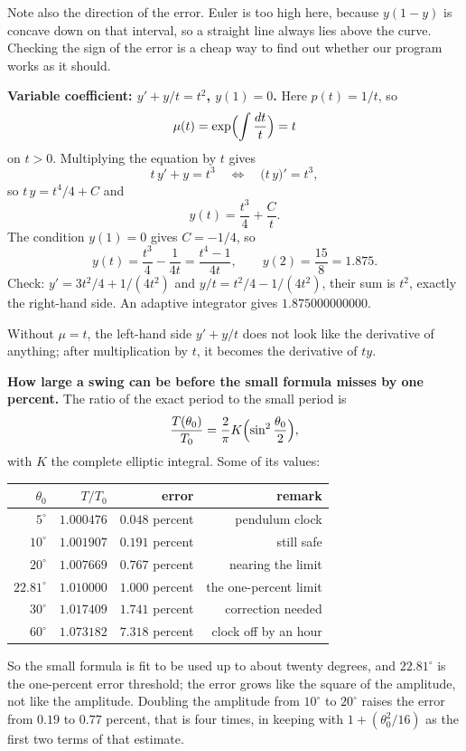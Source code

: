 Note also the direction of the error. Euler is too high here, because
$y(1-y)$ is concave down on that interval, so a straight line always lies above the curve.
Checking the sign of the error is a cheap way to find out whether our program
works as it should.

\textbf{Variable coefficient: $y'+y/t=t^{2}$, $y(1)=0$.}
Here $p(t)=1/t$, so
\[
\mu(t)=\exp\Bigl(\int\frac{dt}{t}\Bigr)=t
\]
on $t>0$. Multiplying the equation by $t$ gives
\[
t\,y'+y=t^{3}
\quad\Longleftrightarrow\quad
\bigl(t\,y\bigr)'=t^{3},
\]
so $t\,y=t^{4}/4+C$ and
\[
y(t)=\frac{t^{3}}{4}+\frac{C}{t}.
\]
The condition $y(1)=0$ gives $C=-1/4$, so
\[
y(t)=\frac{t^{3}}{4}-\frac{1}{4t}=\frac{t^{4}-1}{4t},
\qquad y(2)=\frac{15}{8}=1.875 .
\]
Check: $y'=3t^{2}/4+1/(4t^{2})$ and $y/t=t^{2}/4-1/(4t^{2})$, their sum is
$t^{2}$, exactly the right-hand side. An adaptive integrator gives $1.875000000000$.

Without $\mu=t$, the left-hand side $y'+y/t$ does not look like the derivative of anything;
after multiplication by $t$, it becomes the derivative of $ty$.

\textbf{How large a swing can be before the small formula misses by one percent.}
The ratio of the exact period to the small period is
\[
\frac{T(\theta_{0})}{T_{0}}
=\frac{2}{\pi}K\Bigl(\sin^{2}\frac{\theta_{0}}{2}\Bigr),
\]
with $K$ the complete elliptic integral. Some of its values:

\begin{center}
{\small
\begin{tabular}{rrrr}
\hline
$\theta_{0}$ & $T/T_{0}$ & error & remark \\
\hline
$5^{\circ}$ & $1.000476$ & $0.048$ percent & pendulum clock \\
$10^{\circ}$ & $1.001907$ & $0.191$ percent & still safe \\
$20^{\circ}$ & $1.007669$ & $0.767$ percent & nearing the limit \\
$22.81^{\circ}$ & $1.010000$ & $1.000$ percent & the one-percent limit \\
$30^{\circ}$ & $1.017409$ & $1.741$ percent & correction needed \\
$60^{\circ}$ & $1.073182$ & $7.318$ percent & clock off by an hour \\
\hline
\end{tabular}}
\end{center}

So the small formula is fit to be used up to about twenty degrees, and
$22.81^{\circ}$ is the one-percent error threshold; the error grows like the square of the
amplitude, not like the amplitude.
Doubling the amplitude from $10^{\circ}$ to $20^{\circ}$ raises the error from
$0.19$ to $0.77$ percent, that is four times, in keeping with
$1+(\theta_{0}^{2}/16)$ as the first two terms of that estimate.

